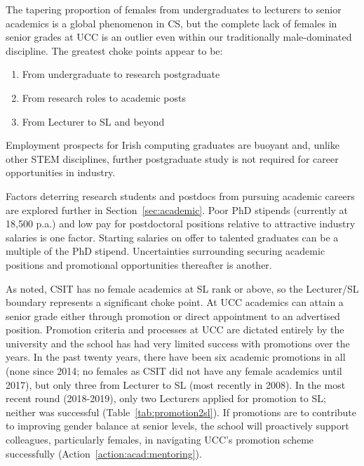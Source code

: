 The tapering proportion of females from undergraduates to lecturers to 
senior academics is a global phenomenon in \ac{CS}, but the 
complete lack of females in senior grades at UCC is an outlier even 
within our traditionally male-dominated discipline. 
The greatest choke points appear to be:


\begin{enumerate}[noitemsep]
    \item From undergraduate to research postgraduate
    \item From research roles to academic posts
    \item From Lecturer to \ac{SL} and beyond
\end{enumerate}


Employment prospects for Irish 
computing graduates are buoyant and, unlike other STEM disciplines, 
further postgraduate study is not required for career opportunities
in industry. 

Factors deterring research students and postdocs from pursuing 
academic careers are explored further in 
Section~\ref{sec:academic}. 
Poor PhD stipends (currently at \texteuro{}18,500 p.a.) and low
pay for postdoctoral positions relative to attractive industry salaries 
is one factor. 
Starting salaries on offer to talented 
graduates can be a multiple of the PhD stipend. 
Uncertainties surrounding  securing academic 
positions and promotional opportunities thereafter is another. 


As noted, CSIT has no female academics at \ac{SL}
rank or above, so the Lecturer/\ac{SL} boundary represents
a significant choke point. \label{slboundary}
At UCC academics can attain a senior grade 
either through promotion or direct appointment to an advertised 
position. Promotion criteria and processes at UCC are 
dictated entirely 
by the university and the school has had very limited success with 
promotions over the years.
In the past twenty years, there have been six academic
promotions in all (none since 2014; no females as CSIT did not 
have any female academics until 2017), 
but only three from Lecturer to 
\ac{SL} (most recently in 2008).
In the most recent round (2018-2019), only two 
Lecturers applied for promotion to \ac{SL}; neither was successful (Table~\ref{tab:promotion2sl}).  
If promotions are to contribute to improving gender balance at senior 
levels, 
the school will proactively support colleagues, particularly
females, in navigating UCC's promotion scheme successfully (Action~\ref{action:acad:mentoring}). 

